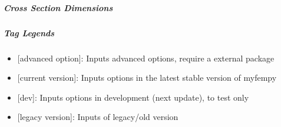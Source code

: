 \documentclass[letterpaper,10pt,english]{sphinxmanual}
\begin{document}
\subparagraph{Cross Section Dimensions}
\label{\detokenize{inputs:cross-section-dimensions}}
\begin{sphinxVerbatim}[commandchars=\\\{\}]


\end{sphinxVerbatim}


\subparagraph{Tag Legends}
\label{\detokenize{inputs:tag-legends}}\begin{itemize}
\item {} 
\sphinxAtStartPar
{[}advanced option{]}: Inputs advanced options, require a external package

\item {} 
\sphinxAtStartPar
{[}current version{]}: Inputs options in the latest  stable version of myfempy

\item {} 
\sphinxAtStartPar
{[}dev{]}: Inputs options in development (next update), to test only

\item {} 
\sphinxAtStartPar
{[}legacy version{]}: Inputs of legacy/old version

\end{itemize}
\end{document}
